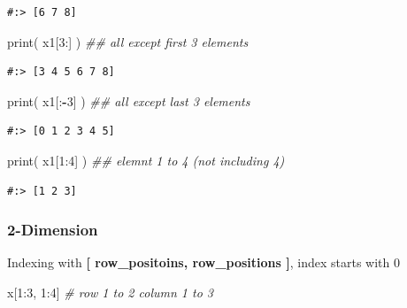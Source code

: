 \documentclass[
]{book}
\newenvironment{Shaded}{\begin{snugshade}}{\end{snugshade}}
\newcommand{\BuiltInTok}[1]{#1}
\newcommand{\CommentTok}[1]{\textcolor[rgb]{0.37,0.37,0.37}{\textit{#1}}}
\newcommand{\DecValTok}[1]{\textcolor[rgb]{0.06,0.06,0.06}{#1}}
\newcommand{\NormalTok}[1]{#1}
\newcommand{\OperatorTok}[1]{\textcolor[rgb]{0.43,0.43,0.43}{\textbf{#1}}}
\begin{document}
\begin{verbatim}
#:> [6 7 8]
\end{verbatim}

\begin{Shaded}
\begin{Highlighting}[]
\BuiltInTok{print}\NormalTok{( x1[}\DecValTok{3}\NormalTok{:]  )  }\CommentTok{## all except first 3 elements}
\end{Highlighting}
\end{Shaded}

\begin{verbatim}
#:> [3 4 5 6 7 8]
\end{verbatim}

\begin{Shaded}
\begin{Highlighting}[]
\BuiltInTok{print}\NormalTok{( x1[:}\OperatorTok{-}\DecValTok{3}\NormalTok{] )  }\CommentTok{## all except last 3 elements}
\end{Highlighting}
\end{Shaded}

\begin{verbatim}
#:> [0 1 2 3 4 5]
\end{verbatim}

\begin{Shaded}
\begin{Highlighting}[]
\BuiltInTok{print}\NormalTok{( x1[}\DecValTok{1}\NormalTok{:}\DecValTok{4}\NormalTok{] )  }\CommentTok{## elemnt 1 to 4 (not including 4)}
\end{Highlighting}
\end{Shaded}

\begin{verbatim}
#:> [1 2 3]
\end{verbatim}

\hypertarget{dimension-1}{%
\subsubsection{2-Dimension}\label{dimension-1}}

Indexing with \textbf{{[} row\_positoins, row\_positions {]}}, index starts with 0

\begin{Shaded}
\begin{Highlighting}[]
\NormalTok{x[}\DecValTok{1}\NormalTok{:}\DecValTok{3}\NormalTok{, }\DecValTok{1}\NormalTok{:}\DecValTok{4}\NormalTok{] }\CommentTok{# row 1 to 2 column 1 to 3}
\end{Highlighting}
\end{Shaded}
\end{document}
